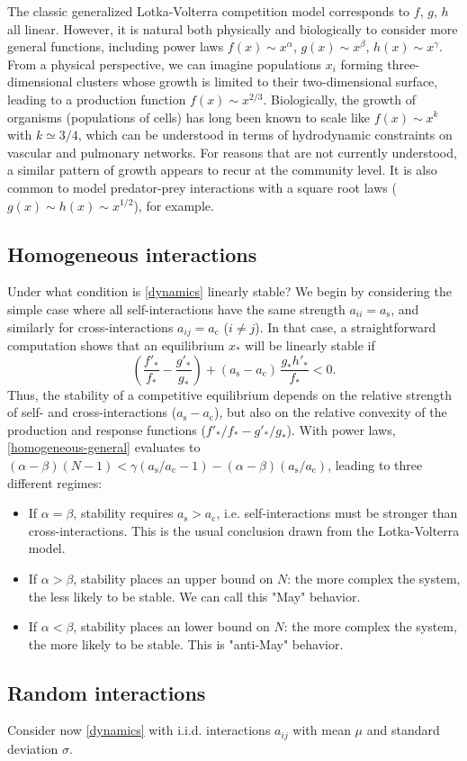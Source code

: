 \documentclass[%
 reprint,
 amsmath,amssymb,
 aps,
]{revtex4-2}
\begin{document}
The classic generalized Lotka-Volterra competition model corresponds to $f$, $g$, $h$ all linear. However, it is natural both physically and biologically to consider more general functions, including power laws $f(x)\sim x^\alpha$, $g(x)\sim x^\beta$, $h(x) \sim x^\gamma$. From a physical perspective, we can imagine populations $x_i$ forming three-dimensional clusters whose growth is limited to their two-dimensional surface, leading to a production function $f(x) \sim x^{2/3}$. Biologically, the growth of organisms (populations of cells) has long been known to scale like $f(x) \sim x^k$ with $k\simeq 3/4$, which can be understood in terms of hydrodynamic constraints on vascular and pulmonary networks. For reasons that are not currently understood, a similar pattern of growth appears to recur at the community level. It is also common to model predator-prey interactions with a square root laws ($g(x) \sim h(x) \sim x^{1/2}$), for example. 

\subsection{Homogeneous interactions}

Under what condition is \eqref{dynamics} linearly stable? We begin by considering the simple case where all self-interactions have the same strength $a_{ii} = a_{\textrm{s}}$, and similarly for cross-interactions $a_{ij} = a_{\textrm{c}}$ ($i\neq j$). In that case, a straightforward computation shows that an equilibrium $x_*$ will be linearly stable if  
\begin{equation}\label{homogeneous-general}
    \left(\frac{f'_*}{f_*} - \frac{g'_*}{g_*}\right) + (a_{\textrm{s}} - a_{\textrm{c}})\,\frac{g_*h'_*}{f_*} < 0. 
\end{equation}
Thus, the stability of a competitive equilibrium depends on the relative strength of self- and cross-interactions ($a_{\textrm{s}} - a_{\textrm{c}}$), but also on the relative convexity of the production and response functions ($f'_*/f_* - g'_*/g_*$). With power laws, \eqref{homogeneous-general} evaluates to $(\alpha - \beta)(N-1) < \gamma(a_{\textrm{s}}/a_{\textrm{c}}- 1) - (\alpha - \beta)(a_{\textrm{s}}/a_{\textrm{c}})$, leading to three different regimes:
\begin{itemize}
    \item If $\alpha = \beta$, stability requires $a_{\textrm{s}} > a_{\textrm{c}}$, i.e. self-interactions must be stronger than cross-interactions. This is the usual conclusion drawn from the Lotka-Volterra model. 
    \item If $\alpha > \beta$, stability places an upper bound on $N$: the more complex the system, the less likely to be stable. We can call this "May" behavior.
    \item If $\alpha < \beta$, stability places an lower bound on $N$: the more complex the system, the more likely to be stable. This is "anti-May" behavior.
\end{itemize}

\subsection{Random interactions}

Consider now \eqref{dynamics} with i.i.d. interactions $a_{ij}$ with mean $\mu$ and standard deviation $\sigma$. 
\end{document}
